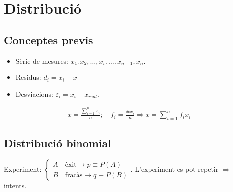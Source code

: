 \section{Distribució}
\subsection{Conceptes previs}
\begin{itemize}
    \item Sèrie de mesures: $x_{1}, x_{2}, \dots , x_{i}, \dots , x_{n-1}, x_{n}$.
    \item Residus: $d_{i} = x_{i} - \bar{x}$.
    \item Desviacions: $\varepsilon_{i} = x_{i} - x_{real}$.
\end{itemize}
\begin{align}
    \bar{x} = \frac{\sum\limits_{i=1}^{n} x_{i}}{n}; \quad f_{i}= \frac{\# x_{i}}{n} \Rightarrow \bar{x} = \sum\limits_{i=1}^{n} f_{i} x_{i}
\end{align}

\subsection{Distribució binomial}
Experiment: $\begin{cases} A \quad \text{èxit} \to p \equiv P(A) \\ B \quad \text{fracàs} \to q \equiv P(B) \end{cases}$. L'experiment es pot repetir $\Rightarrow$ intents.

